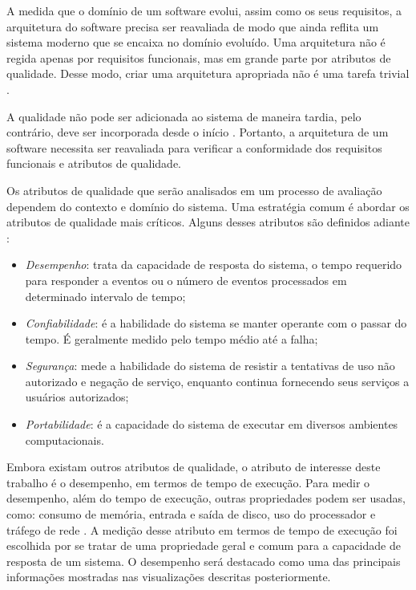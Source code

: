 A medida que o domínio de um software evolui, assim como os seus requisitos, a arquitetura do software precisa ser reavaliada de modo que ainda reflita um sistema moderno que se encaixa no domínio evoluído. Uma arquitetura não é regida apenas por requisitos funcionais, mas em grande parte por atributos de qualidade. Desse modo, criar uma arquitetura apropriada não é uma tarefa trivial \cite{Svahnberg2002}.

A qualidade não pode ser adicionada ao sistema de maneira tardia, pelo contrário, deve ser incorporada desde o início \cite{Svahnberg2002}. Portanto, a arquitetura de um software necessita ser reavaliada para verificar a conformidade dos requisitos funcionais e atributos de qualidade.

Os atributos de qualidade que serão analisados em um processo de avaliação dependem do contexto e domínio do sistema. Uma estratégia comum é abordar os atributos de qualidade mais críticos. Alguns desses atributos são definidos adiante \cite{Kazman2001}:
\begin{itemize}
	\item \textit{Desempenho}: trata da capacidade de resposta do sistema, o tempo requerido para responder a eventos ou o número de eventos processados em determinado intervalo de tempo;
	\item \textit{Confiabilidade}: é a habilidade do sistema se manter operante com o passar do tempo. É geralmente medido pelo tempo médio até a falha;
	\item \textit{Segurança}: mede a habilidade do sistema de resistir a tentativas de uso não autorizado e negação de serviço, enquanto continua fornecendo seus serviços a usuários autorizados;
	\item \textit{Portabilidade}: é a capacidade do sistema de executar em diversos ambientes computacionais.
\end{itemize}

Embora existam outros atributos de qualidade, o atributo de interesse deste trabalho é o desempenho, em termos de tempo de execução. Para medir o desempenho, além do tempo de execução, outras propriedades podem ser usadas, como: consumo de memória, entrada e saída de disco, uso do processador e tráfego de rede \cite{Malik2013}. A medição desse atributo em termos de tempo de execução foi escolhida por se tratar de uma propriedade geral e comum para a capacidade de resposta de um sistema. O desempenho será destacado como uma das principais informações mostradas nas visualizações descritas posteriormente.

